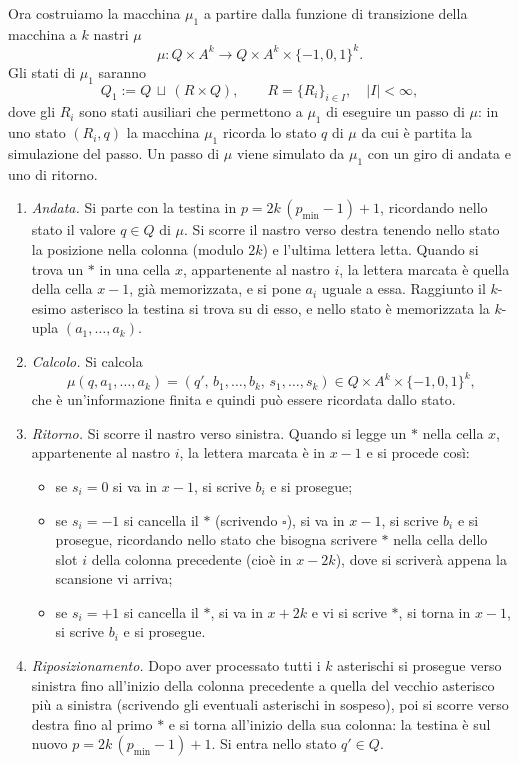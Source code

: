 \medskip
Ora costruiamo la macchina $\mu_1$ a partire dalla funzione di transizione della macchina
a $k$ nastri $\mu$
\[
  \mu\colon Q \times A^k \longrightarrow Q \times A^k \times \{-1,0,1\}^k .
\]
Gli stati di $\mu_1$ saranno
\[
  Q_1 := Q \,\sqcup\, (R \times Q),
  \qquad R = \{R_i\}_{i\in I}, \quad |I| < \infty,
\]
dove gli $R_i$ sono stati ausiliari che permettono a $\mu_1$ di eseguire un passo di
$\mu$: in uno stato $(R_i, q)$ la macchina $\mu_1$ ricorda lo stato $q$ di $\mu$ da cui è
partita la simulazione del passo. Un passo di $\mu$ viene simulato da $\mu_1$ con un giro
di andata e uno di ritorno.
\begin{enumerate}
  \item \emph{Andata.} Si parte con la testina in $p = 2k\,(p_{\min}-1)+1$, ricordando
        nello stato il valore $q \in Q$ di $\mu$. Si scorre il nastro verso destra tenendo
        nello stato la posizione nella colonna (modulo $2k$) e l'ultima lettera letta.
        Quando si trova un $*$ in una cella $x$, appartenente al nastro $i$, la lettera
        marcata è quella della cella $x-1$, già memorizzata, e si pone $a_i$ uguale a
        essa. Raggiunto il $k$-esimo asterisco la testina si trova su di esso, e nello
        stato è memorizzata la $k$-upla $(a_1,\dots,a_k)$.
  \item \emph{Calcolo.} Si calcola
        \[
          \mu(q, a_1,\dots,a_k) = (q',\, b_1,\dots,b_k,\, s_1,\dots,s_k)
          \in Q \times A^k \times \{-1,0,1\}^k ,
        \]
        che è un'informazione finita e quindi può essere ricordata dallo stato.
  \item \emph{Ritorno.} Si scorre il nastro verso sinistra. Quando si legge un $*$ nella
        cella $x$, appartenente al nastro $i$, la lettera marcata è in $x-1$ e si procede
        così:
        \begin{itemize}
          \item se $s_i = 0$ si va in $x-1$, si scrive $b_i$ e si prosegue;
          \item se $s_i = -1$ si cancella il $*$ (scrivendo $\square$), si va in $x-1$, si
                scrive $b_i$ e si prosegue, ricordando nello stato che bisogna scrivere
                $*$ nella cella dello slot $i$ della colonna precedente (cioè in
                $x-2k$), dove si scriverà appena la scansione vi arriva;
          \item se $s_i = +1$ si cancella il $*$, si va in $x+2k$ e vi si scrive $*$, si
                torna in $x-1$, si scrive $b_i$ e si prosegue.
        \end{itemize}
  \item \emph{Riposizionamento.} Dopo aver processato tutti i $k$ asterischi si prosegue
        verso sinistra fino all'inizio della colonna precedente a quella del vecchio
        asterisco più a sinistra (scrivendo gli eventuali asterischi in sospeso), poi si
        scorre verso destra fino al primo $*$ e si torna all'inizio della sua colonna: la
        testina è sul nuovo $p = 2k\,(p_{\min}-1)+1$. Si entra nello stato
        $q' \in Q$.
\end{enumerate}
